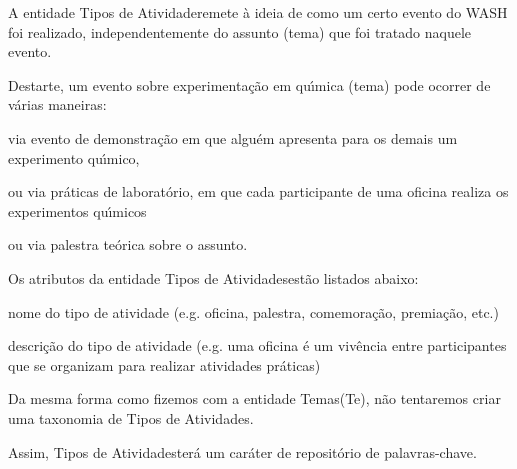 \documentclass[
12pt,		%
openright,	%
twoside,  %
a4paper,			%
chapter=TITLE,		%
english,			%
french,				%
spanish,			%
brazil				%
]{USPSC-classe/USPSC}
\begin{document}
A entidade \textquotedbl Tipos de Atividade\textquotedbl  remete \`a ideia de como um certo evento do WASH foi realizado, independentemente do assunto (tema) que foi tratado naquele evento.










Destarte, um evento sobre experimenta\c{c}\~ao em qu\'{\i}mica (tema) pode ocorrer de v\'arias maneiras:











\begin{alineas}
\item via evento de demonstra\c{c}\~ao em que algu\'em apresenta para os demais um experimento qu\'{\i}mico,
\item ou via pr\'aticas de laborat\'orio, em que cada participante de uma oficina realiza os experimentos qu\'{\i}micos
\item ou via palestra te\'orica sobre o assunto.
\end{alineas}

Os atributos da entidade \textquotedbl Tipos de Atividades\textquotedbl  est\~ao listados abaixo:











\begin{alineas}
\item nome do tipo de atividade (e.g. oficina, palestra, comemora\c{c}\~ao, premia\c{c}\~ao, etc.)
\item descri\c{c}\~ao do tipo de atividade (e.g. \textquotedbl uma oficina \'e um viv\^encia entre participantes que se organizam para realizar atividades pr\'aticas\textquotedbl )
\end{alineas}

Da mesma forma como fizemos com a entidade \textquotedbl Temas\textquotedbl  (Te), n\~ao tentaremos criar uma taxonomia de \textquotedbl Tipos de Atividades\textquotedbl .










Assim, \textquotedbl Tipos de Atividades\textquotedbl  ter\'a um car\'ater de reposit\'orio de palavras-chave.
\end{document}

